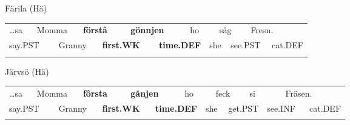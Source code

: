 \begin{styleExLtrTblii}
Färila (Hä)

\end{styleExLtrTblii}

\begin{tabular}{llllllllllllll}
\lsptoprule
…sa & \multicolumn{2}{l}{Momma

} & \multicolumn{2}{l}{{\bfseries förstâ}

} & \multicolumn{2}{l}{{\bfseries gönnjen}

} & \multicolumn{2}{l}{ho

} & \multicolumn{2}{l}{såg

} & \multicolumn{2}{l}{Fresn.

} & \\
\multicolumn{2}{l}{say.PST

} & \multicolumn{2}{l}{Granny

} & \multicolumn{2}{l}{{\bfseries first.WK}

} & \multicolumn{2}{l}{{\bfseries time.DEF}

} & \multicolumn{2}{l}{she

} & \multicolumn{2}{l}{see.PST

} & \multicolumn{2}{l}{cat.DEF

}\\
\lspbottomrule
\end{tabular}

\begin{styleExLtrTblii}
Järvsö (Hä)

\end{styleExLtrTblii}

\begin{tabular}{llllllllllllllll}
\lsptoprule
…sa & \multicolumn{2}{l}{Momma

} & \multicolumn{2}{l}{{\bfseries fôrsta}

} & \multicolumn{2}{l}{{\bfseries gånjen}

} & \multicolumn{2}{l}{ho

} & \multicolumn{2}{l}{feck

} & \multicolumn{2}{l}{si

} & \multicolumn{2}{l}{Fräsen.

} & \\
\multicolumn{2}{l}{say.PST

} & \multicolumn{2}{l}{Granny

} & \multicolumn{2}{l}{{\bfseries first.WK}

} & \multicolumn{2}{l}{{\bfseries time.DEF}

} & \multicolumn{2}{l}{she

} & \multicolumn{2}{l}{get.PST

} & \multicolumn{2}{l}{see.INF

} & \multicolumn{2}{l}{cat.DEF

}\\
\lspbottomrule
\end{tabular}

